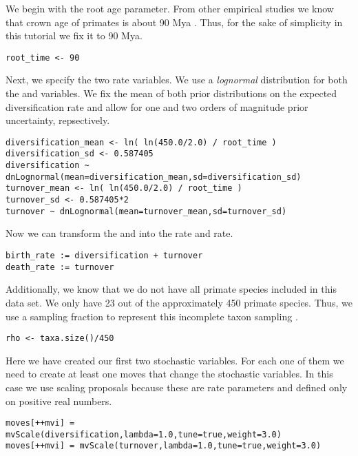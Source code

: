 We begin with the root age parameter.
From other empirical studies we know that crown age of primates is about 90 Mya \citep{Perelman2011}.
Thus, for the sake of simplicity in this tutorial we fix it to 90 Mya.
{\tt \begin{snugshade*}
\begin{lstlisting}
root_time <- 90
\end{lstlisting}
\end{snugshade*}}
Next, we specify the two rate variables.
We use a \textit{lognormal} distribution for both the  and  variables.
We fix the mean of both prior distributions on the expected diversification rate and allow for one and two orders of magnitude prior uncertainty, repsectively.
{\tt \begin{snugshade*}
\begin{lstlisting}
diversification_mean <- ln( ln(450.0/2.0) / root_time )
diversification_sd <- 0.587405
diversification ~ dnLognormal(mean=diversification_mean,sd=diversification_sd) 
turnover_mean <- ln( ln(450.0/2.0) / root_time )
turnover_sd <- 0.587405*2
turnover ~ dnLognormal(mean=turnover_mean,sd=turnover_sd) 
\end{lstlisting}
\end{snugshade*}}
Now we can transform the  and  into the  rate and  rate.
{\tt \begin{snugshade*}
\begin{lstlisting}
birth_rate := diversification + turnover
death_rate := turnover
\end{lstlisting}
\end{snugshade*}}
Additionally, we know that we do not have all primate species included in this data set.
We only have 23 out of the approximately 450 primate species.
Thus, we use a sampling fraction to represent this incomplete taxon sampling  \citep{Hoehna2011,Hoehna2014a}.
{\tt \begin{snugshade*}
\begin{lstlisting}
rho <- taxa.size()/450
\end{lstlisting}
\end{snugshade*}}
Here we have created our first two stochastic variables.
For each one of them we need to create at least one moves that change the stochastic variables.
In this case we use scaling proposals because these are rate parameters and defined only on positive real numbers.
{\tt \begin{snugshade*}
\begin{lstlisting} 
moves[++mvi] = mvScale(diversification,lambda=1.0,tune=true,weight=3.0)
moves[++mvi] = mvScale(turnover,lambda=1.0,tune=true,weight=3.0)
\end{lstlisting}
\end{snugshade*}}

